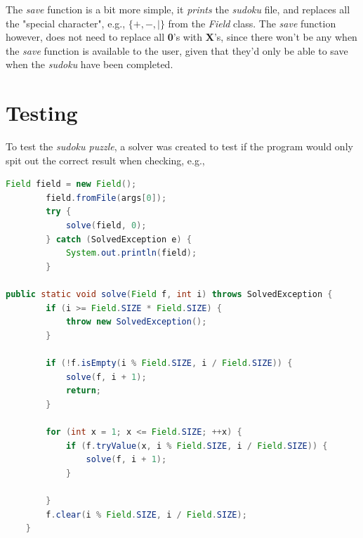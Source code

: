 \documentclass[a4paper,10pt]{article}
\begin{document}
The \textit{save} function is a bit more simple, it \textit{prints} the \textit{sudoku} file, and replaces all the "special character", e.g., $\{ + , - , | \}$ from the \textit{Field} class. The \textit{save} function however, does not need to replace all \textbf{0}'s with \textbf{X}'s, since there won't be any when the \textit{save} function is available to the user, given that they'd only be able to save when the \textit{sudoku} have been completed.

\section{Testing}

To test the \textit{sudoku puzzle}, a solver was created to test if the program would only spit out the correct result when checking, e.g.,

\begin{lstlisting}[language=java]
Field field = new Field();
        field.fromFile(args[0]);
        try {
            solve(field, 0);
        } catch (SolvedException e) {
            System.out.println(field);
        }

public static void solve(Field f, int i) throws SolvedException {
        if (i >= Field.SIZE * Field.SIZE) {
            throw new SolvedException();
        }

        if (!f.isEmpty(i % Field.SIZE, i / Field.SIZE)) {
            solve(f, i + 1);
            return;
        }

        for (int x = 1; x <= Field.SIZE; ++x) {
            if (f.tryValue(x, i % Field.SIZE, i / Field.SIZE)) {
                solve(f, i + 1);
            }

        }
        f.clear(i % Field.SIZE, i / Field.SIZE);
    }
\end{lstlisting}
\end{document}
